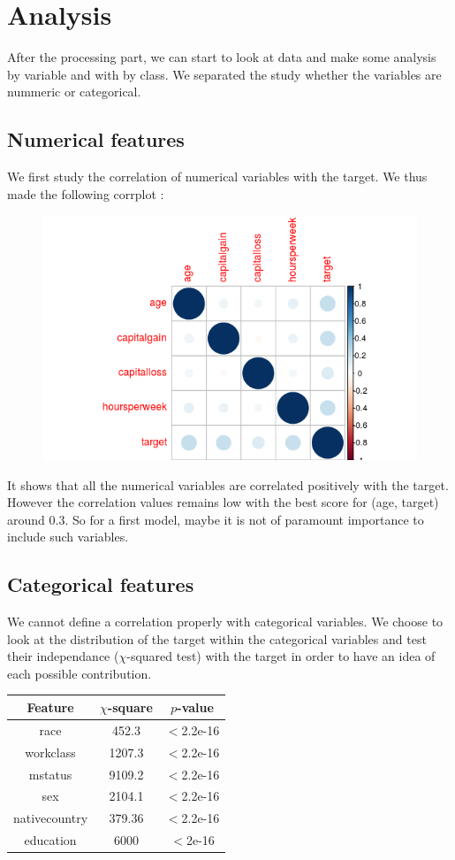 \documentclass[11pt]{article}
\begin{document}
\section{Analysis}
After the processing part, we can start to look at data and make some analysis by variable and with by class. We separated the study whether the variables are nummeric or categorical.

\subsection{Numerical features}
We first study the correlation of numerical variables with the target. We thus made the following corrplot :

\begin{figure}[!h]
	\centering
	\includegraphics[width=.6\textwidth]{images/plot_corr.png}
\end{figure}
It shows that all the numerical variables are correlated positively with the target. However the correlation values remains low with the best score for (age, target) around 0.3. So for a first model, maybe it is not of paramount importance to include such variables.

\subsection{Categorical features}
We cannot define a correlation properly with categorical variables. We choose to look at the distribution of the target within the categorical variables and test their independance ($\chi$-squared test) with the target in order to have an idea of each possible contribution.

\begin{center}
\begin{tabular}{|c|c|c|}
Feature & $\chi$-square & $p$-value \\
\hline
race & 452.3 & $<$2.2e-16\\
workclass & 1207.3 & $<$2.2e-16\\
mstatus & 9109.2 & $<$2.2e-16\\
sex & 2104.1 & $<$2.2e-16\\
nativecountry & 379.36 & $<$2.2e-16 \\
education & 6000 & $<$2e-16
\end{tabular}
\end{center}
\end{document}
